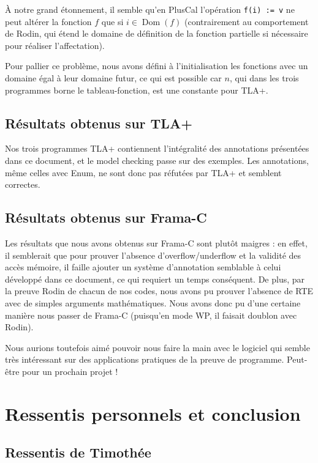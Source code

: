 \documentclass[a4paper, 11pt]{article}
\DeclareMathOperator{\ddom}{Dom}
\newcommand{\dom}[1]{\ddom\left(#1\right)}
\theoremstyle{mystyle}
\begin{document}
\`A notre grand étonnement, il semble qu'en PlusCal l'opération \texttt{f(i) := v} ne peut altérer la fonction $f$ que si $i \in \dom{f}$ (contrairement au comportement de Rodin, qui étend le domaine de définition de la fonction partielle si nécessaire pour réaliser l'affectation).

Pour pallier ce problème, nous avons défini à l'initialisation les fonctions avec un domaine égal à leur domaine futur, ce qui est possible car $n$, qui dans les trois programmes borne le tableau-fonction, est une constante pour TLA+.

\subsection{Résultats obtenus sur TLA+}

Nos trois programmes TLA+ contiennent l'intégralité des annotations présentées dans ce document, et le model checking passe sur des exemples. Les annotations, même celles avec Enum, ne sont donc pas réfutées par TLA+ et semblent correctes.

\subsection{Résultats obtenus sur Frama-C}

Les résultats que nous avons obtenus sur Frama-C sont plutôt maigres : en effet, il semblerait que pour prouver l'absence d'overflow/underflow et la validité des accès mémoire, il faille ajouter un système d'annotation semblable à celui développé dans ce document, ce qui requiert un temps conséquent. De plus, par la preuve Rodin de chacun de nos codes, nous avons pu prouver l'absence de RTE avec de simples arguments mathématiques. Nous avons donc pu d'une certaine manière nous passer de Frama-C (puisqu'en mode WP, il faisait doublon avec Rodin).

Nous aurions toutefois aimé pouvoir nous faire la main avec le logiciel qui semble très intéressant sur des applications pratiques de la preuve de programme. Peut-être pour un prochain projet !

\clearpage\section{Ressentis personnels et conclusion}

\subsection{Ressentis de Timothée}
\end{document}
